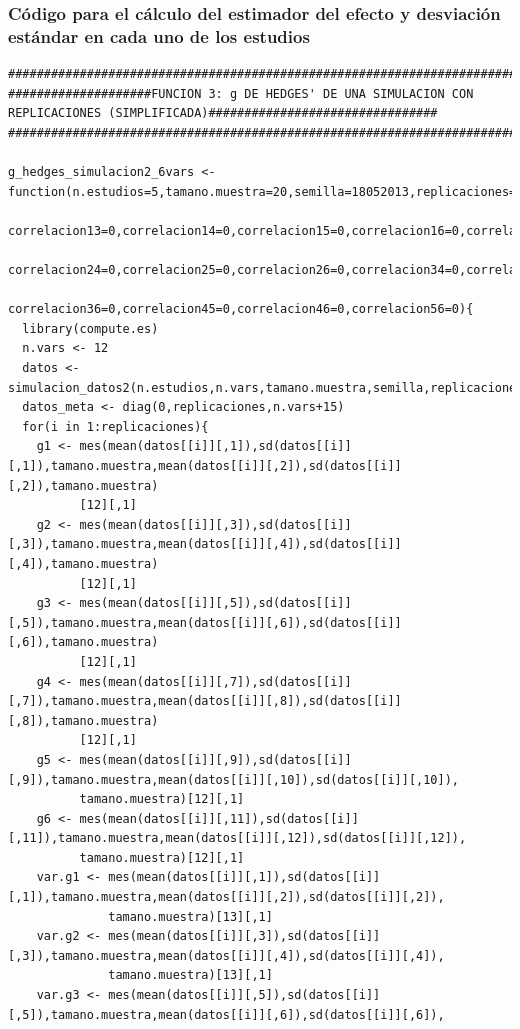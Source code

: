 \documentclass[a4paper,openright,12pt]{report}
\begin{document}
\subsubsection{Código para el cálculo del estimador del efecto y desviación estándar en cada uno de los estudios}
{\tiny
\begin{verbatim}
##############################################################################################################################
####################FUNCION 3: g DE HEDGES' DE UNA SIMULACION CON REPLICACIONES (SIMPLIFICADA)################################
##############################################################################################################################

g_hedges_simulacion2_6vars <- function(n.estudios=5,tamano.muestra=20,semilla=18052013,replicaciones=5,correlacion12=0,
                                       correlacion13=0,correlacion14=0,correlacion15=0,correlacion16=0,correlacion23=0,
                                       correlacion24=0,correlacion25=0,correlacion26=0,correlacion34=0,correlacion35=0,
                                       correlacion36=0,correlacion45=0,correlacion46=0,correlacion56=0){
  library(compute.es)
  n.vars <- 12
  datos <- simulacion_datos2(n.estudios,n.vars,tamano.muestra,semilla,replicaciones) 
  datos_meta <- diag(0,replicaciones,n.vars+15)
  for(i in 1:replicaciones){
    g1 <- mes(mean(datos[[i]][,1]),sd(datos[[i]][,1]),tamano.muestra,mean(datos[[i]][,2]),sd(datos[[i]][,2]),tamano.muestra)
          [12][,1]
    g2 <- mes(mean(datos[[i]][,3]),sd(datos[[i]][,3]),tamano.muestra,mean(datos[[i]][,4]),sd(datos[[i]][,4]),tamano.muestra)
          [12][,1]
    g3 <- mes(mean(datos[[i]][,5]),sd(datos[[i]][,5]),tamano.muestra,mean(datos[[i]][,6]),sd(datos[[i]][,6]),tamano.muestra)
          [12][,1]
    g4 <- mes(mean(datos[[i]][,7]),sd(datos[[i]][,7]),tamano.muestra,mean(datos[[i]][,8]),sd(datos[[i]][,8]),tamano.muestra)
          [12][,1]
    g5 <- mes(mean(datos[[i]][,9]),sd(datos[[i]][,9]),tamano.muestra,mean(datos[[i]][,10]),sd(datos[[i]][,10]),
          tamano.muestra)[12][,1]
    g6 <- mes(mean(datos[[i]][,11]),sd(datos[[i]][,11]),tamano.muestra,mean(datos[[i]][,12]),sd(datos[[i]][,12]),
          tamano.muestra)[12][,1]
    var.g1 <- mes(mean(datos[[i]][,1]),sd(datos[[i]][,1]),tamano.muestra,mean(datos[[i]][,2]),sd(datos[[i]][,2]),
              tamano.muestra)[13][,1]
    var.g2 <- mes(mean(datos[[i]][,3]),sd(datos[[i]][,3]),tamano.muestra,mean(datos[[i]][,4]),sd(datos[[i]][,4]),
              tamano.muestra)[13][,1]
    var.g3 <- mes(mean(datos[[i]][,5]),sd(datos[[i]][,5]),tamano.muestra,mean(datos[[i]][,6]),sd(datos[[i]][,6]),

\end{verbatim}}
\end{document}
